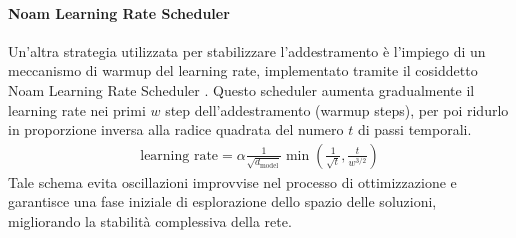 \paragraph{Noam Learning Rate Scheduler}
Un'altra strategia utilizzata per stabilizzare l'addestramento è l'impiego di un meccanismo di warmup del learning rate, implementato tramite il cosiddetto Noam Learning Rate Scheduler \cite{noamlearningrate,vaswani2023attentionneed}. Questo scheduler aumenta gradualmente il learning rate nei primi \(w\) step dell'addestramento (warmup steps), per poi ridurlo in proporzione inversa alla radice quadrata del numero \(t\) di passi temporali.
\begin{align}
	\text{learning rate} = \alpha \frac{1}{\sqrt{d_{\text{model}}}} \min \left(\frac{1}{\sqrt{t}}, \frac{t}{w^{3/2}} \right)
	\label{eq:noam-scheduler}
\end{align}
Tale schema evita oscillazioni improvvise nel processo di ottimizzazione e garantisce una fase iniziale di esplorazione dello spazio delle soluzioni, migliorando la stabilità complessiva della rete.


